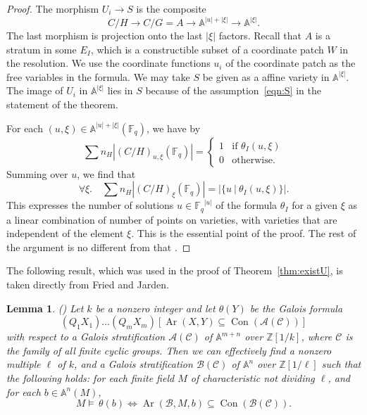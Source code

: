 \documentclass[11pt]{amsart}
\newtheorem{lemma}[theorem]{Lemma}
\theoremstyle{definition}
\theoremstyle{remark}
\numberwithin{equation}{theorem}
\def\f{{\mathbb{F}_q}}
\def\calC{{\mathcal{C}}}
\def\calA{{\mathcal{A}}}
\def\calB{{\mathcal{B}}}
\def\tq{{\ \vert\ }}
\newcommand{\ring}[1]{\mathbb{#1}}
\def\op#1{\operatorname{#1}}
\begin{document}
\begin{proof}
The morphism $U_i \to S$ is the composite
   \begin{equation}C/H \to C/G = A \to \ring{A}^{|u|+|\xi|} \to
   \ring{A}^{|\xi|}.\end{equation}
The last morphism is projection onto the last $|\xi|$ factors.
Recall that $A$ is a stratum in some $E_I$, which is a
constructible subset of a coordinate patch $W$ in the resolution.
We use the coordinate functions $u_i$ of the coordinate patch as
the free variables in the formula.  We may take $S$ be given as a
affine variety in $\ring{A}^{|\xi|}$.  The image of $U_i$ in
$\ring{A}^{|\xi|}$ lies in $S$ because of the
assumption~\ref{eqn:S} in the statement of the theorem.

For each $(u,\xi)\in \ring{A}^{|u|+|\xi|}(\f)$, we have by
\cite[3.3.2]{DLD}
   \begin{equation}
   \sum n_H |(C/H)_{u,\xi}(\f)| = \begin{cases}
      1 & \text{if } \theta_I(u,\xi)\\
      0 &\text{otherwise.}
      \end{cases}
   \end{equation}
Summing over $u$, we find that
   \begin{equation}
   \forall\xi.\quad
      \sum n_H |(C/H)_\xi(\f)| = |\{u \tq \theta_I(u,\xi)\}|.
   \end{equation}
This expresses the number of solutions $u\in\f^{|u|}$ of the
formula $\theta_I$ for a given $\xi$ as a linear combination of
number of points on varieties, with varieties that are independent
of the element $\xi$.  This is the essential point of the proof.
The rest of the argument is no different from that \cite{DLD}.
\end{proof}

The following result, which was used in the proof of
Theorem~\ref{thm:existU}, is taken directly from Fried and Jarden.

\begin{lemma} \label{lemma:FJ} (\cite[Prop.~26.7]{FJ})
Let $k$ be a nonzero integer and let $\theta(Y)$ be the Galois
formula
   \begin{equation}
   (Q_1 X_1)\ldots (Q_m X_m) [\op{Ar}(X,Y) \subseteq
   \op{Con}(\calA(\calC))]
   \end{equation}
with respect to a Galois stratification $\calA(\calC)$ of
$\ring{A}^{m+n}$ over $\ring{Z}[1/k]$, where $\calC$ is the family
of all finite cyclic groups.  Then we can effectively find a
nonzero multiple $\ell$ of $k$, and a Galois stratification
$\calB(\calC)$ of $\ring{A}^n$ over $\ring{Z}[1/\ell]$ such that
the following holds: for each finite field $M$ of characteristic
not dividing $\ell$, and for each $b\in \ring{A}^n(M)$,
   \begin{equation}
   M \models \, \theta(b) \Leftrightarrow \op{Ar}(\calB,M,b)\subseteq
   \op{Con}(\calB(\calC)).
   \end{equation}
\end{lemma}
\end{document}
